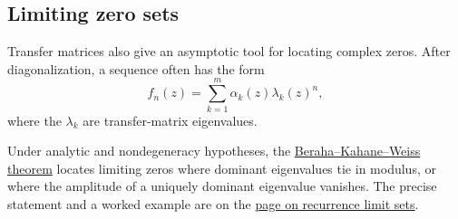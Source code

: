 \subsection[berahaKahaneWeiss]{Limiting zero sets}

Transfer matrices also give an asymptotic tool for locating complex zeros.
After diagonalization, a sequence often has the form
\[
  f_n(z)=\sum_{k=1}^m \alpha_k(z)\lambda_k(z)^n,
\]
where the $\lambda_k$ are transfer-matrix eigenvalues.

Under analytic and nondegeneracy hypotheses, the
\hyperref[toeplitzBkwTheorem]{Beraha--Kahane--Weiss theorem}
\cite{Beraha75limits,Sokal2004ChromaticRoots} locates limiting zeros
where dominant eigenvalues tie in modulus, or where the amplitude of a
uniquely dominant eigenvalue vanishes.
The precise statement and a worked example are on the
\hyperref[toeplitzBkw]{page on recurrence limit sets}.

